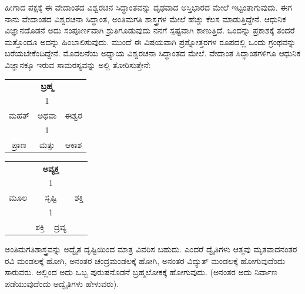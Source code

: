 ಹೀಗಾದ ಪಕ್ಷಕ್ಕೆ ಈ ವೇದಾಂತದ ವಿಶ್ವರಚನ ಸಿದ್ಧಾಂತವನ್ನು ದೃಢವಾದ ಅಸ್ತಿಭಾರದ ಮೇಲೆ ಇಟ್ಟಂತಾಗುವುದು. ಈಗ ನಾನು ವೇದಾಂತದ ವಿಶ್ವರಚನಾ ಸಿದ್ಧಾಂತ, ಅಂತಿಮಗತಿ ಶಾಸ್ತ್ರಗಳ ಮೇಲೆ ಹೆಚ್ಚು ಕೆಲಸ ಮಾಡುತ್ತಿದ್ದೇನೆ. ಆಧುನಿಕ ವಿಜ್ಞಾನದೊಡನೆ ಅದು ಸಂಪೂರ್ಣವಾಗಿ ಶ್ರುತಿಗೂಡುವುದು ನನಗೆ ಸ್ಪಷ್ಟವಾಗಿ ಕಾಣುತ್ತಿದೆ. ಒಂದನ್ನು ಪ್ರಕಾಶಕ್ಕೆ ತಂದರೆ ಮತ್ತೊಂದೂ ಅದನ್ನು ಹಿಂಬಾಲಿಸುವುದು. ಮುಂದೆ ಈ ವಿಷಯವಾಗಿ ಪ್ರಶ್ನೋತ್ತರಗಳ ರೂಪದಲ್ಲಿ ಒಂದು ಗ್ರಂಥವನ್ನು ಬರೆಯಬೇಕೆಂದಿದ್ದೇನೆ. ಮೊದಲನೆಯ ಅಧ್ಯಾಯ ವಿಶ್ವರಚನಾ ಸಿದ್ಧಾಂತದ  ಮೇಲೆ. ವೇದಾಂತ ಸಿದ್ಧಾಂತಗಳಿಗೂ ಆಧುನಿಕ ವಿಜ್ಞಾನಕ್ಕೂ ಇರುವ ಸಾಮರಸ್ಯವನ್ನು ಅಲ್ಲಿ ತೋರಿಸುತ್ತೇನೆ:

\vspace{-0.2cm}

\begin{center}
\begin{tabular}{c@{$\;$}c@{$\;$}c}
& \textbf{ಬ್ರಹ್ಮ } &\\
& 1 & \\
ಮಹತ್ & ಅಥವಾ & ಈಶ್ವರ \\
& 1 & \\
ಪ್ರಾಣ & ಮತ್ತು &  ಆಕಾಶ 
\end{tabular}
\qquad 
\begin{tabular}{c@{}c@{}c}
& \textbf{ಅವ್ಯಕ್ತ} &\\
& 1 & \\
ಮೂಲ  & ಸೃಷ್ಟಿ  & ಶಕ್ತಿ \\
& 1 & \\
& ಶಕ್ತಿ ~  ದ್ರವ್ಯ & 
\end{tabular}
\end{center}

\vspace{-0.2cm}

ಅಂತಿಮಗತಿಶಾಸ್ತ್ರವನ್ನು  ಅದ್ವೈತ ದೃಷ್ಟಿಯಿಂದ ಮಾತ್ರ ವಿವರಿಸ ಬಹುದು. ಎಂದರೆ ದ್ವೈತಿಗಳು ಆತ್ಮವು ಮೃತವಾದನಂತರ ರವಿ ಮಂಡಲಕ್ಕೆ ಹೋಗಿ, ಅನಂತರ ಚಂದ್ರಮಂಡಲಕ್ಕೆ ಹೋಗಿ, ಅನಂತರ ವಿದ್ಯುತ್ ಮಂಡಲಕ್ಕೆ ಹೋಗುವುದೆಂದು ಸಾರುವರು. ಅಲ್ಲಿಂದ ಅದು ಒಬ್ಬ ಪುರುಷನೊಡನೆ ಬ್ರಹ್ಮಲೋಕಕ್ಕೆ ಹೋಗುವುದು. (ಅನಂತರ ಅದು ನಿರ್ವಾಣ ಪಡೆಯುವುದೆಂದು ಅದ್ವೈತಿಗಳು ಹೇಳುವರು).

